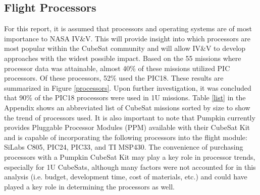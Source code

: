 \documentclass[11pt]{article}
\begin{document}
\subsection{Flight Processors}
For this report, it is assumed that processors and operating systems are of most importance to NASA IV\&V.  This will provide insight into which processors are most popular within the CubeSat community and will allow IV\&V to develop approaches with the widest possible impact.  Based on the 55 missions where processor data was attainable, almost 40\% of these missions utilized PIC processors.  Of these processors, 52\% used the PIC18.  These results are summarized in Figure \ref{processors}.  Upon further investigation, it was concluded that 90\% of the PIC18 processors were used in 1U missions.  Table \ref{list} in the Appendix shows an abbreviated list of CubeSat missions sorted by size to show the trend of processors used.  It is also important to note that Pumpkin currently provides Pluggable Processor Modules (PPM) available with their CubeSat Kit and is capable of incorporating the following processors into the flight module:  SiLabs C805, PIC24, PIC33, and TI MSP430.  The convenience of purchasing processors with a Pumpkin CubeSat Kit may play a key role in processor trends, especially for 1U CubeSats, although many factors were not accounted for in this analysis (i.e. budget, development time, cost of materials, etc.) and  could have played a key role in determining the processors as well.
\end{document}
